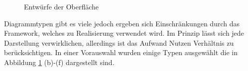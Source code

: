 \begin{figure}[htbp]
\hfill
{}
\caption{Entwürfe der Oberfläche}
\label{konzept_darstellung}
\end{figure}

Diagrammtypen gibt es viele jedoch ergeben sich Einschränkungen durch das Framework, welches zu Realisierung verwendet wird. Im Prinzip lässt sich jede Darstellung verwirklichen, allerdings ist das Aufwand Nutzen Verhältnis zu berücksichtigen. In einer Vorauswahl wurden einige Typen ausgewählt die in Abbildung \ref{konzept_darstellung} (b)-(f) dargestellt sind. 


